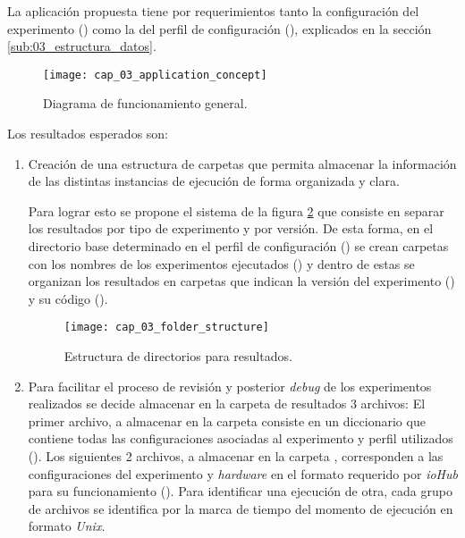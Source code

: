 \documentclass[\main/Main.tex]{subfiles}
\begin{document}
			La aplicación propuesta tiene por requerimientos tanto la configuración del experimento () como la del perfil de configuración (), explicados en la sección \ref{sub:03_estructura_datos}.

			\begin{figure}[H]
				\centering
				\texttt{[image: cap\_03\_application\_concept]}
				\caption{Diagrama de funcionamiento general.}
				\label{fig:03_application_concept}
			\end{figure} 

			Los resultados esperados son:
			\begin{enumerate}\setlength\itemsep{-0.5em}
				\item Creación de una estructura de carpetas que permita almacenar la información de las distintas instancias de ejecución de forma organizada y clara. 

				Para lograr esto se propone el sistema de la figura \ref{fig:03_folder_structure} que consiste en separar los resultados por tipo de experimento y por versión. De esta forma, en el directorio base determinado en el perfil de configuración () se crean carpetas con los nombres de los experimentos ejecutados () y dentro de estas se organizan los resultados en carpetas que indican la versión del experimento () y su código ().  
				\begin{figure}[H]
					\centering
					\texttt{[image: cap\_03\_folder\_structure]}
					\caption{Estructura de directorios para resultados.}
					\label{fig:03_folder_structure}
				\end{figure} 

				\item Para facilitar el proceso de revisión y posterior \textit{debug} de los experimentos realizados se decide almacenar en la carpeta de resultados 3 archivos: El primer archivo, a almacenar en la carpeta  consiste en un diccionario que contiene todas las configuraciones asociadas al experimento y perfil utilizados (). Los siguientes 2 archivos, a almacenar en la carpeta , corresponden a las configuraciones del experimento y \textit{hardware} en el formato requerido por \textit{ioHub} para su funcionamiento (). Para identificar una ejecución de otra, cada grupo de archivos se identifica por la marca de tiempo del momento de ejecución en formato \textit{Unix}.


\end{enumerate}
\end{document}
